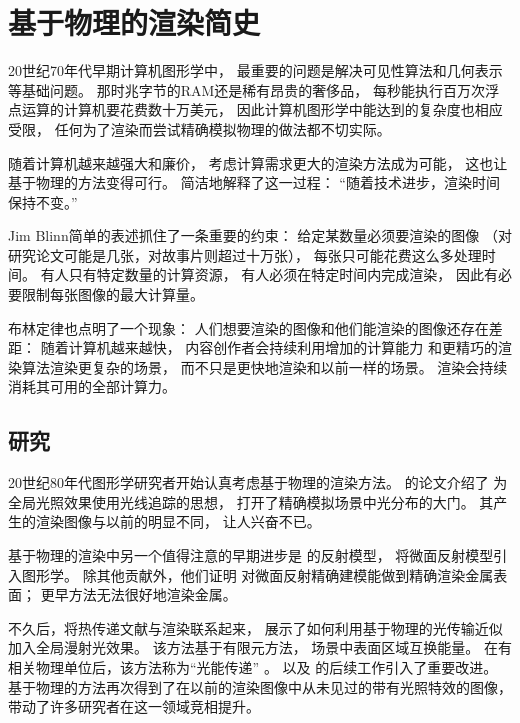 \section{基于物理的渲染简史}\label{sec:基于物理的渲染简史}

20世纪70年代早期计算机图形学中，
最重要的问题是解决可见性算法和几何表示等基础问题。
那时兆字节的RAM还是稀有昂贵的奢侈品，
每秒能执行百万次浮点运算的计算机要花费数十万美元，
因此计算机图形学中能达到的复杂度也相应受限，
任何为了渲染而尝试精确模拟物理的做法都不切实际。

随着计算机越来越强大和廉价，
考虑计算需求更大的渲染方法成为可能，
这也让基于物理的方法变得可行。
简洁地解释了这一过程：
“随着技术进步，渲染时间保持不变。”

Jim Blinn简单的表述抓住了一条重要的约束：
给定某数量必须要渲染的图像
（对研究论文可能是几张，对故事片则超过十万张），
每张只可能花费这么多处理时间。
有人只有特定数量的计算资源，
有人必须在特定时间内完成渲染，
因此有必要限制每张图像的最大计算量。

布林定律也点明了一个现象：
人们想要渲染的图像和他们能渲染的图像还存在差距：
随着计算机越来越快，
内容创作者会持续利用增加的计算能力
和更精巧的渲染算法渲染更复杂的场景，
而不只是更快地渲染和以前一样的场景。
渲染会持续消耗其可用的全部计算力。

\subsection{研究}\label{sub:研究}
20世纪80年代图形学研究者开始认真考虑基于物理的渲染方法。
\citet{10.1145/358876.358882}的论文介绍了
为全局光照效果使用光线追踪的思想，
打开了精确模拟场景中光分布的大门。
其产生的渲染图像与以前的明显不同，
让人兴奋不已。

基于物理的渲染中另一个值得注意的早期进步是
\citet{10.1145/800224.806819,10.1145/357290.357293}的反射模型，
将微面反射模型引入图形学。
除其他贡献外，他们证明
对微面反射精确建模能做到精确渲染金属表面；
更早方法无法很好地渲染金属。

不久后，\citet{10.1145/800031.808601}将热传递文献与渲染联系起来，
展示了如何利用基于物理的光传输近似加入全局漫射光效果。
该方法基于有限元方法，
场景中表面区域互换能量。
在有相关物理单位后，该方法称为“光能传递”
。
\citet{10.1145/325334.325171}以及
\citet{10.1145/325334.325169}的后续工作引入了重要改进。
基于物理的方法再次得到了在以前的渲染图像中从未见过的带有光照特效的图像，
带动了许多研究者在这一领域竞相提升。

